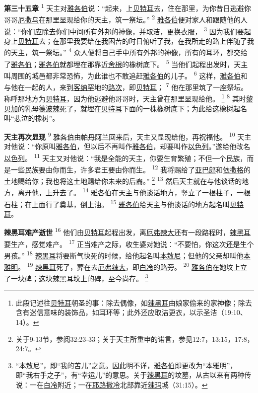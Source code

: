 \textbf{第三十五章\quad}
\textsuperscript{1}
天主对\uline{雅各伯}说：“起来，上\uline{贝特耳}去，住在那里，为你昔日逃避你哥哥\uline{厄撒乌}在那里显现给你的天主，筑一祭坛。”
\textsuperscript{2}
\uline{雅各伯}便对家人和跟随他的人说：“你们应除去你们中间所有外邦的神像，并取洁，更换衣服，
\textsuperscript{3}
因为我们要起身上\uline{贝特耳}去；在那里我要给在我困苦的时日俯听了我，在我所走的路上伴随了我的天主，筑一祭坛。”
\textsuperscript{4}
众人便将自己手中所有外邦的神像，所有的耳环，都交给了\uline{雅各伯}；\uline{雅各伯}就都埋在那靠近\uline{舍根}的橡树底下。
\textsuperscript{5}
当他们起程出发时，天主叫周围的城邑都非常恐怖，为此谁也不敢追赶\uline{雅各伯}的儿子。
\textsuperscript{6}
这样，\uline{雅各伯}和与他在一起的人，来到\uline{客纳罕}地的\uline{路次}，即\uline{贝特耳}；
\textsuperscript{7}
他在那里筑了一座祭坛。称呼那地方为\uline{贝特耳}，因为他逃避他哥哥时，天主曾在那里显现给他。
\footnote{此段记述往\uline{贝特耳}朝圣的事：除去偶像，如\uline{辣黑耳}由娘家偷来的家神像；除去含有迷信意味的装饰品，如耳环等；此外还应取洁更衣，以示圣洁（19:10、14）。}
\textsuperscript{8}
其时\uline{黎贝加}的乳母\uline{德波辣}死了，就埋在\uline{贝特耳}下面的一株橡树底下；为此给这橡树起名叫“悲泣的橡树”。

\textbf{天主再次显现\quad}
\textsuperscript{9}
\uline{雅各伯}由\uline{帕丹阿兰}回来后，天主又显现给他，再祝福他。
\textsuperscript{10}
天主对他说：“你原叫\uline{雅各伯}，但以后不再叫作\uline{雅各伯}，却要叫作\uline{以色列}。”遂给他改名\uline{以色列}。
\textsuperscript{11}
天主又对他说：“我是全能的天主，你要生育繁殖；不但一个民族，而是一些民族要由你而生，许多君王要由你而生。
\textsuperscript{12}
我将赐给了\uline{亚巴郎}和\uline{依撒格}的土地赐给你；我也将这土地赐给你未来的后裔。”
\footnote{关于9-13节，参阅32:23-33；关于天主所重申的诺言，参见12:7，13:15，17:8，24:7。}
\textsuperscript{13}
然后天主就在与他谈话的地方，离开他，上升去了。
\textsuperscript{14}
\uline{雅各伯}在天主与他谈话地方，竖立了一根柱子，一根石柱；在上面行了奠基，倒上油。
\textsuperscript{15}
\uline{雅各伯}给天主与他谈话的地方起名叫\uline{贝特耳}。

\textbf{辣黑耳难产逝世\quad}
\textsuperscript{16}
他们由\uline{贝特耳}起程出发，离\uline{厄弗}\uline{辣大}还有一段路程时，\uline{辣黑耳}要生产，感觉难产。
\textsuperscript{17}
正当难产之际，收生婆对她说：“不要怕，你这次还是生个男孩。”
\textsuperscript{18}
\uline{辣黑耳}将要断气快死的时候，给他起名叫\uline{本敖尼}；但他的父亲却叫他\uline{本雅明}。
\textsuperscript{19}
\uline{辣黑耳}死了，葬在去\uline{厄弗}\uline{辣大}，即\uline{白冷}的路旁。
\textsuperscript{20}
\uline{雅各伯}在她坟上立了一块碑；这块\uline{辣黑耳}坟上的碑，至今尚存。
\footnote{“本敖尼”，即“我的苦儿”之意。因此明不详，\uline{雅各伯}即更改为“本雅明”，即“我右手之子”，有“幸运儿”的意思。关于\uline{辣黑耳}的坟墓，从古以来有两种传说：一在\uline{白冷}附近；一在\uline{耶路撒冷}北部靠近\uline{辣玛}城（31:15）。}

